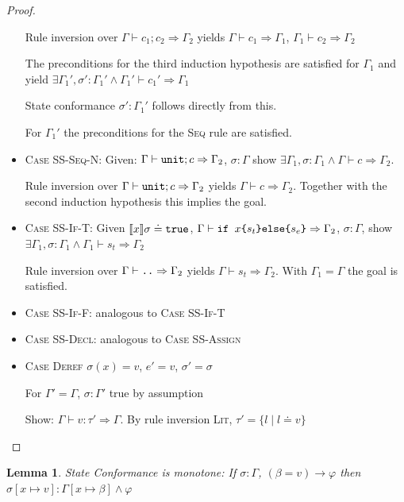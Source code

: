 \documentclass[twoside, english]{sdqthesis}
\newtheorem{lemma}[theorem]{Lemma}
\theoremstyle{definition}
\begin{document}
\begin{proof}
\begin{itemize}
    Rule inversion over $\Gamma \vdash c_1 ; c_2 \Rightarrow \Gamma_2$ yields $\Gamma \vdash c_1 \Rightarrow \Gamma_1$, $\Gamma_1 \vdash c_2 \Rightarrow \Gamma_2$

    The preconditions for the third induction hypothesis are satisfied for $\Gamma_1$ and yield 
    $\exists \Gamma_1', \sigma' : \Gamma_1' \wedge \Gamma_1' \vdash c_1' \Rightarrow \Gamma_1$

    State conformance $\sigma' : \Gamma_1'$ follows directly from this.

    For $\Gamma_1'$ the preconditions for the \textsc{Seq} rule are satisfied.
  \item \textsc{Case SS-Seq-N}: 
    Given: $\Gamma \vdash \code{unit}; c \Rightarrow \Gamma_2$, $\sigma : \Gamma$
    show $\exists \Gamma_1, \sigma : \Gamma_1 \wedge \Gamma \vdash c \Rightarrow \Gamma_2$.

    Rule inversion over $\Gamma \vdash \code{unit}; c \Rightarrow \Gamma_2$ yields $\Gamma \vdash c \Rightarrow \Gamma_2$.
    Together with the second induction hypothesis this implies the goal.
  \item \textsc{Case SS-If-T}:
     Given $\llbracket x \rrbracket \sigma \doteq \code{true}$, $\Gamma \vdash \code{if $x$\{$s_t$\}else\{$s_e$\}} \Rightarrow \Gamma_2$, $\sigma : \Gamma$, show $\exists \Gamma_1, \sigma : \Gamma_1 \wedge \Gamma_1 \vdash s_t \Rightarrow \Gamma_2$
    
    Rule inversion over $\Gamma \vdash \code{..} \Rightarrow \Gamma_2$ yields $\Gamma \vdash s_t \Rightarrow \Gamma_2$.
    With $\Gamma_1 = \Gamma$ the goal is satisfied.
  \item \textsc{Case SS-If-F}: analogous to \textsc{Case SS-If-T}
  \item \textsc{Case SS-Decl}: analogous to \textsc{Case SS-Assign}
  \item \textsc{Case Deref}
    $\sigma(x) = v$, $e' = v$, $\sigma' = \sigma$

    For $\Gamma' = \Gamma$, $\sigma : \Gamma'$ true by assumption

    Show: $\Gamma \vdash v : \tau' \Rightarrow \Gamma$. By rule inversion \textsc{Lit}, $\tau' = \{ l \mid l \doteq v \}$
\end{itemize}
\end{proof}

\begin{lemma}
  State Conformance is monotone: If $\sigma : \Gamma$, $(\beta = v) \to \varphi$ then
    $\sigma[x \mapsto v] : \Gamma[x \mapsto \beta] \wedge \varphi$
\end{lemma}
\end{document}
